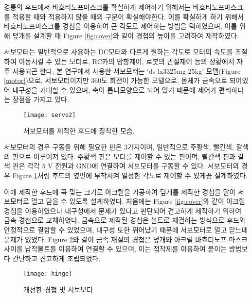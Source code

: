 경통의 후드에서 바흐티노프마스크를 확실하게 제어하기 위해서는 바흐티노프마스크를 적용할 때와 적용하지 않을 때의 구분이 확실해야한다. 이를 확실하게 하기 위해서 바흐티노프마스크를 경첩을 이용하여 큰 각도로 제어하는 방법을 택하였으며, 이를 위해 덮개를 설계할 때 \textrm{Figure} \ref{fig:cover}와 같이 경첩의 높이를 고려하여 제작하였다.

서보모터는 일반적으로 사용하는 DC모터와 다르게 원하는 각도로 모터의 속도를 조절하여 이동시킬 수 있는 모터로,  RC카의 방향제어, 로봇의 관절제어 등의 상황에서 자주 사용되곤 한다. 본 연구에서 사용한 서보모터는 ‘ds lx3325mg 25kg’ 모델(\textrm{Figure} \ref{motor})으로, 서보모터이지만 360도 회전이 가능한 모델으로, 몸체가 금속으로 되어있어 내구성을 기대할 수 있으며, 축이 톱니모양으로 되어 있기 때문에 제어가 편리하다는 장점을 가지고 있다.

\begin{figure}[h]
	\begin{center}
		\texttt{[image: servo2]}
	\end{center}
	\caption{서보모터를 제작한 후드에 장착한 모습.}
	\label{motorcover}
\end{figure}

서보모터의 경우 구동을 위해 필요한 핀은 3가지이며, 일반적으로 주황색, 빨간색, 갈색의 핀으로 이루어져 있다. 주황색 핀은 모터를 제어할 수 있는 핀이며, 빨간색 핀과 갈색 핀은 각각 $\textrm{5 V}$ 전원과 GND에 연결하여 서보모터를 구동할 수 있다. 서보모터의 경우 \textrm{Figure} \ref{motorcover}처럼 후드의 옆면에 부착시켜 일정한 각도로 제어할 수 있게끔 설계하였다.

이에 제작한 후드에 꼭 맞는 크기로 아크릴을 가공하여 덮개를 제작한 경첩을 달아 서보모터로 열고 닫을 수 있도록 설계하였다. 처음에는 \textrm{Figure} \ref{fig:cover}와 같이 아크릴 경첩을 이용하였으나 내구성에서 문제가 있다고 판단되어 견고하게 제작하기 위하여 금속 경첩으로 교체하였다. 금속으로 제작된 경첩은 볼트로 체결하는 방식으로 후드와 안정적으로 결합할 수 있었으며, 내구성 또한 뛰어났기 때문에 서보모터로 열고 닫느데 문제가 없었다. \textrm{Figure} \ref{hinge}와 같이 금속 재질의 경첩은 덮개와 아크릴 바흐티노프 마스크 사이를 납작볼트를 이용하여 연결할 수 있으며, 이는 접착제를 이용하여 붙이는 방법보다 간단하고 견고하게 조립되었다.

\begin{figure}[h]
	\begin{center}
		\texttt{[image: hinge]}
	\end{center}
	\caption{개선한 경첩 및 서보모터}
	\label{hinge}
\end{figure}



